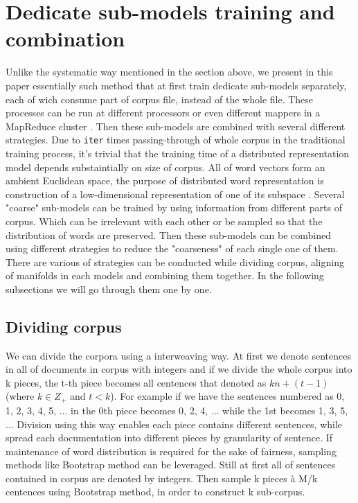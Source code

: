 \documentclass[11pt,a4paper]{article}
\begin{document}
\section{Dedicate sub-models training and combination}
Unlike the systematic way mentioned in the section above, we present in this paper essentially such method that at first train dedicate sub-models separately, each of wich consume part of corpus file, instead of the whole file. These processes can be run at different processors or even different mappers in a MapReduce cluster \cite{dean2008mapreduce}. Then these sub-models are combined with several different strategies. Due to \verb|iter| times passing-through of whole corpus in the traditional training process, it's trivial that the training time of a distributed representation model depends substaintially on size of corpus. All of word vectors form an ambient Euclidean space, the purpose of distributed word representation is construction of a low-dimensional representation of one of its subspace \cite{Mahadevan2015reasoning}. Several "coarse" sub-models can be trained by using information from different parts of corpus. Which can be irrelevant with each other or be sampled so that the distribution of words are preserved. Then these sub-models can be combined using different strategies to reduce the "coarseness" of each single one of them. There are various of strategies can be conducted while dividing corpus, aligning of manifolds in each models and combining them together. In the following subsections we will go through them one by one.

  \subsection{Dividing corpus}
  We can divide the corpora using a interweaving way. At first we denote sentences in all of documents in corpus with integers and if we divide the whole corpus into k pieces, the t-th piece becomes all centences that denoted as $kn+(t-1)$ (where $k\in Z_+$ and $t<k$). For example if we have the sentences numbered as 0, 1, 2, 3, 4, 5, ... in the 0th piece becomes 0, 2, 4, ... while the 1st becomes 1, 3, 5, ... Division using this way enables each piece contains different sentences, while spread each documentation into different pieces by granularity of sentence.
  If maintenance of word distribution is required for the sake of fairness, sampling methods like Bootstrap method \cite{efron1992bootstrap} can be leveraged. Still at first all of sentences contained in corpus are denoted by integers. Then sample k pieces {\`a} M/k centences using Bootstrap method, in order to construct k sub-corpus.
\end{document}
